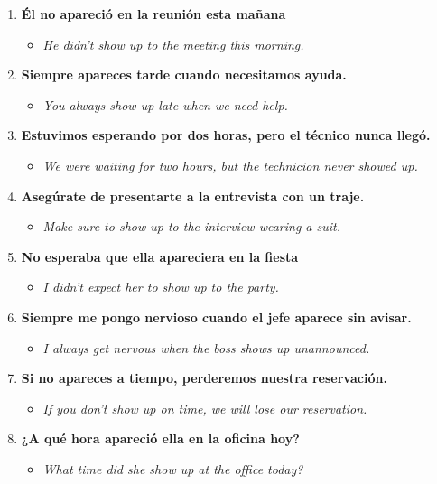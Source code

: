 \documentclass[
10pt, %
a4paper, %
oneside, %
headinclude,footinclude, %
BCOR5mm, %
]{scrartcl}
\begin{document}
\begin{enumerate}
	\item \textbf{Él no apareció en la reunión esta mañana}
	\begin{itemize}
		\item \textit{He didn't show up to the meeting this morning.}
	\end{itemize}
	\item \textbf{Siempre apareces tarde cuando necesitamos ayuda.}
	\begin{itemize}
		\item \textit{You always show up late when we need help.}
	\end{itemize}
	\item \textbf{Estuvimos esperando por dos horas, pero el técnico nunca llegó.}
	\begin{itemize}
		\item \textit{We were waiting for two hours, but the technicion never showed up.}
	\end{itemize}
	\item \textbf{Asegúrate de presentarte a la entrevista con un traje.}
	\begin{itemize}
		\item \textit{Make sure to show up to the interview wearing a suit.}
	\end{itemize}
	\item \textbf{No esperaba que ella apareciera en la fiesta}
	\begin{itemize}
		\item \textit{I didn't expect her to show up to the party.}
	\end{itemize}
	\item \textbf{Siempre me pongo nervioso cuando el jefe aparece sin avisar.}
	\begin{itemize}
		\item \textit{I always get nervous when the boss shows up unannounced.}
	\end{itemize}
	\item \textbf{Si no apareces a tiempo, perderemos nuestra reservación.}
	\begin{itemize}
		\item \textit{If you don't show up on time, we will lose our reservation.}
	\end{itemize}
	\item \textbf{¿A qué hora apareció ella en la oficina hoy?}
	\begin{itemize}
		\item \textit{What time did she show up at the office today?}

\end{itemize}
\end{enumerate}
\end{document}

